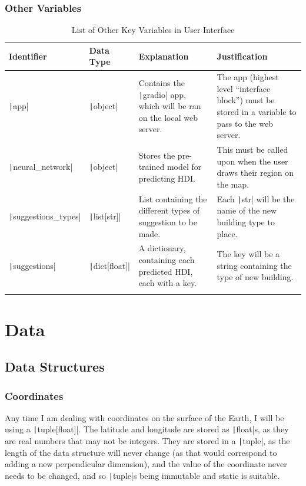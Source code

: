 \documentclass[12pt]{report}
\newcommand{\pil}[1]{\protect\texttt|#1|}
\begin{document}
\subsubsection{Other Variables}
\begin{center}
\begin{longtable}{ | m{3cm} | m{4cm}| m{4cm} | m{4cm} |} 
    \hline
    \textbf{Identifier} & \textbf{Data Type} & \textbf{Explanation}  & \textbf{Justification} \\ 
    \hline
    \pil{app} & \pil{object} & Contains the \pil{gradio} app, which will be ran on the local web server. & The app (highest level ``interface block'') must be stored in a variable to pass to the web server. \\ 
    \hline
    \pil{neural_network} & \pil{object} & Stores the pre-trained model for predicting HDI. & This must be called upon when the user draws their region on the map. \\ 
    \hline
    \pil{suggestions_types} & \pil{list[str]} & List containing the different types of suggestion to be made. & Each \pil{str} will be the name of the new building type to place. \\ 
    \hline
    \pil{suggestions} & \pil{dict[float]} & A dictionary, containing each predicted HDI, each with a key. & The key will be a string containing the type of new building. \\ 
    \hline
\caption{List of Other Key Variables in User Interface}
\end{longtable}
\end{center}

\section{Data}
\subsection{Data Structures}
\subsubsection{Coordinates}
Any time I am dealing with coordinates on the surface of the Earth, I will be using a \pil{tuple[float]}. The latitude and longitude are stored as \pil{float}s, as they are real numbers that may not be integers. They are stored in a \pil{tuple}, as the length of the data structure will never change (as that would correspond to adding a new perpendicular dimension), and the value of the coordinate never needs to be changed, and so \pil{tuple}s being immutable and static is suitable.
\end{document}
